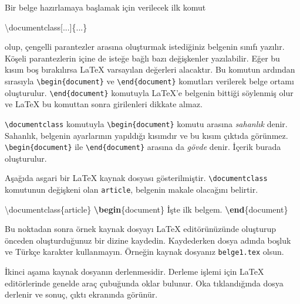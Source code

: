 \documentclass[
  10pt,
]{scrbook}
\newenvironment{Shaded}{\begin{snugshade}}{\end{snugshade}}
\newcommand{\BuiltInTok}[1]{#1}
\newcommand{\ExtensionTok}[1]{#1}
\newcommand{\KeywordTok}[1]{\textcolor[rgb]{0.13,0.29,0.53}{\textbf{#1}}}
\newcommand{\NormalTok}[1]{#1}
\theoremstyle{definition}
\theoremstyle{definition}
\theoremstyle{definition}
\theoremstyle{definition}
\theoremstyle{remark}
\begin{document}
Bir belge hazırlamaya başlamak için verilecek ilk komut

\begin{Shaded}
\begin{Highlighting}[]
\BuiltInTok{\textbackslash{}documentclass}\NormalTok{[...]\{}\ExtensionTok{...}\NormalTok{\}}
\end{Highlighting}
\end{Shaded}

olup, çengelli parantezler arasına oluşturmak istediğiniz belgenin sınıfı yazılır. Köşeli parantezlerin içine de isteğe bağlı bazı değişkenler yazılabilir. Eğer bu kısım boş bırakılırsa LaTeX varsayılan değerleri alacaktır. Bu komutun ardından sırasıyla \texttt{\textbackslash{}begin\{document\}} ve \texttt{\textbackslash{}end\{document\}} komutları verilerek belge ortamı oluşturulur. \texttt{\textbackslash{}end\{document\}} komutuyla LaTeX'e belgenin bittiği söylenmiş olur ve LaTeX bu komuttan sonra girilenleri dikkate almaz.

\texttt{\textbackslash{}documentclass} komutuyla \texttt{\textbackslash{}begin\{document\}} komutu arasına \emph{sahanlık} denir. Sahanlık, belgenin ayarlarının yapıldığı kısımdır ve bu kısım çıktıda görünmez. \texttt{\textbackslash{}begin\{document\}} ile \texttt{\textbackslash{}end\{document\}} arasına da \emph{gövde} denir. İçerik burada oluşturulur.

Aşağıda asgari bir LaTeX kaynak dosyası gösterilmiştir. \texttt{\textbackslash{}documentclass} komutunun değişkeni olan \texttt{article}, belgenin makale olacağını belirtir.

\begin{Shaded}
\begin{Highlighting}[]
\BuiltInTok{\textbackslash{}documentclass}\NormalTok{\{}\ExtensionTok{article}\NormalTok{\}}
\KeywordTok{\textbackslash{}begin}\NormalTok{\{}\ExtensionTok{document}\NormalTok{\}}
\NormalTok{  İşte ilk belgem.}
\KeywordTok{\textbackslash{}end}\NormalTok{\{}\ExtensionTok{document}\NormalTok{\}}
\end{Highlighting}
\end{Shaded}

Bu noktadan sonra örnek kaynak dosyayı LaTeX editörünüzünde oluşturup önceden oluşturduğunuz bir dizine kaydedin. Kaydederken dosya adında boşluk ve Türkçe karakter kullanmayın. Örneğin kaynak dosyanız \texttt{belge1.tex} olsun.

İkinci aşama kaynak dosyanın derlenmesidir. Derleme işlemi için LaTeX editörlerinde genelde araç çubuğunda oklar bulunur. Oka tıklandığında dosya derlenir ve sonuç, çıktı ekranında görünür.
\end{document}
